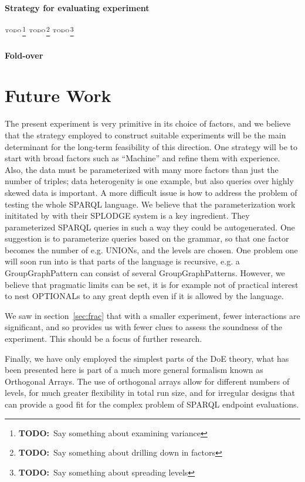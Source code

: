 \documentclass{llncs}
\newcommand{\todo}[1]{\ensuremath{^{\textrm{\tiny{TODO}\normalsize}}}\footnote{\textbf{TODO:}~#1}}
\begin{document}
\paragraph{Strategy for evaluating experiment}\todo{Say something
  about examining variance} \todo{Say something about drilling down in
  factors} \todo{Say something about spreading levels}

\paragraph{Fold-over}

\section{Future Work}

The present experiment is very primitive in its choice of factors, and
we believe that the strategy employed to construct suitable
experiments will be the main determinant for the long-term feasibility
of this direction. One strategy will be to start with broad factors
such as ``Machine'' and refine them with experience. Also, the data
must be parameterized with many more factors than just the number of
triples; data heterogenity \cite{Duan:2011:AOC:1989323.1989340} is one
example, but also queries over highly skewed data is important. A more
difficult issue is how to address the problem of testing the whole
SPARQL language\cite{sparql11query}. We believe that the
parameterization work inititated by \cite{goerlitz2012splodge} with
their SPLODGE system is a key ingredient. They parameterized SPARQL
queries in such a way they could be autogenerated. One suggestion is
to parameterize queries based on the grammar, so that one factor
becomes the number of e.g. UNIONs, and the levels are chosen. One
problem one will soon run into is that parts of the language is
recursive, e.g. a GroupGraphPattern can consist of several
GroupGraphPatterns. However, we believe that pragmatic limits can be
set, it is for example not of practical interest to nest OPTIONALs to
any great depth even if it is allowed by the language.

We saw in section~\ref{sec:frac} that with a smaller experiment, fewer
interactions are significant, and so provides us with fewer clues to
assess the soundness of the experiment. This should be a focus of
further research. 


Finally, we have only employed the simplest parts of the DoE
theory, what has been presented here is part of a much more general
formalism known as Orthogonal Arrays. The use of orthogonal arrays
allow for different numbers of levels, for much greater flexibility in
total run size, and for irregular designs that can provide a good fit
for the complex problem of SPARQL endpoint evaluations. 
\end{document}
